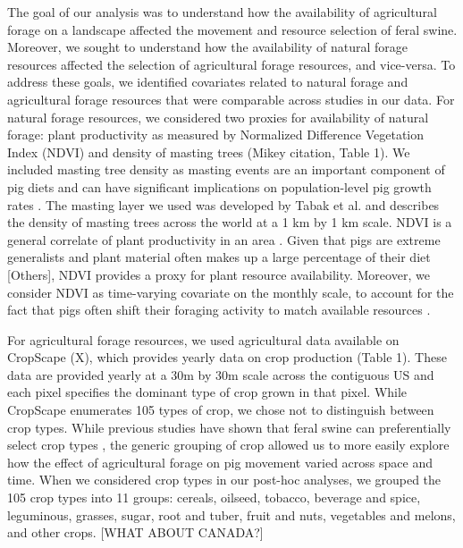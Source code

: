 \documentclass[a4paper]{article}
\begin{document}
The goal of our analysis was to understand how the availability of agricultural forage on a landscape affected the movement and resource selection of feral swine.  Moreover, we sought to understand how the availability of natural forage resources affected the selection of agricultural forage resources, and vice-versa. To address these goals, we identified covariates related to natural forage and agricultural forage resources that were comparable across studies in our data.  For natural forage resources, we considered two proxies for availability of natural forage: plant productivity as measured by Normalized Difference Vegetation Index (NDVI) and density of masting trees (Mikey citation, Table 1). We included masting tree density as masting events are an important component of pig diets and can have significant implications on population-level pig growth rates \citep[e.g.][]{Bieber2005}.  The masting layer we used was developed by Tabak et al. and describes the density of masting trees across the world at a 1 km by 1 km scale.  NDVI is a general correlate of plant productivity in an area \citep{Pettorelli2005}.  Given that pigs are extreme generalists and plant material often makes up a large percentage of their diet \citep{Mayer2009} [Others], NDVI provides a proxy for plant resource availability.  Moreover, we consider NDVI as time-varying covariate on the monthly scale, to account for the fact that pigs often shift their foraging activity to match available resources \citep{Mayer2009}.

For agricultural forage resources, we used agricultural data available on CropScape (X), which provides yearly data on crop production (Table 1). These data are provided yearly at a 30m by 30m scale across the contiguous US and each pixel specifies the dominant type of crop grown in that pixel.  While CropScape enumerates 105 types of crop, we chose not to distinguish between crop types. While previous studies have shown that feral swine can preferentially select crop types \citep[e.g.][]{Herrero2006}, the generic grouping of crop allowed us to more easily explore how the effect of agricultural forage on pig movement varied across space and time.  When we considered crop types in our post-hoc analyses, we grouped the 105 crop types into 11 groups: cereals, oilseed, tobacco, beverage and spice, leguminous, grasses, sugar, root and tuber, fruit and nuts, vegetables and melons, and other crops. [WHAT ABOUT CANADA?]
\end{document}
